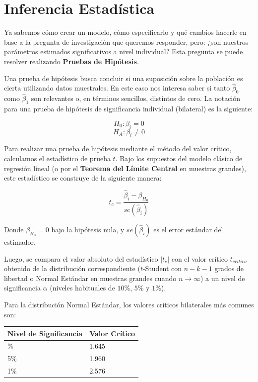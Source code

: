 \documentclass[
]{book}
\newcounter{none} %
\begin{document}
\section{Inferencia Estadística}\label{inferencia-estaduxedstica}

Ya sabemos cómo crear un modelo, cómo especificarlo y qué cambios hacerle en base a la pregunta de investigación que queremos responder, pero: ¿son nuestros parámetros estimados significativos a nivel individual? Esta pregunta se puede resolver realizando \textbf{Pruebas de Hipótesis}.

Una prueba de hipótesis busca concluir si una suposición sobre la población es cierta utilizando datos muestrales. En este caso nos interesa saber si tanto \(\hat{\beta}_0\) como \(\hat{\beta}_1\) son relevantes o, en términos sencillos, distintos de cero. La notación para una prueba de hipótesis de significancia individual (bilateral) es la siguiente:

\[H_0: \beta_i = 0\]
\[H_A: \beta_i \neq 0\]

Para realizar una prueba de hipótesis mediante el método del valor crítico, calculamos el estadístico de prueba \(t\). Bajo los supuestos del modelo clásico de regresión lineal (o por el \textbf{Teorema del Límite Central} en muestras grandes), este estadístico se construye de la siguiente manera:

\[t_c = \frac{\hat{\beta}_i - \beta_{H_0}}{se(\hat{\beta}_i)}\]

Donde \(\beta_{H_0} = 0\) bajo la hipótesis nula, y \(se(\hat{\beta}_i)\) es el error estándar del estimador.

Luego, se compara el valor absoluto del estadístico \(|t_c|\) con el valor crítico \(t_{critico}\) obtenido de la distribución correspondiente (\(t\)-Student con \(n-k-1\) grados de libertad o Normal Estándar en muestras grandes cuando \(n\rightarrow \infty\)) a un nivel de significancia \(\alpha\) (niveles habituales de \(10\%\), \(5\%\) y \(1\%\)).

Para la distribución Normal Estándar, los valores críticos bilaterales más comunes son:

{\def\LTcaptype{none} %
\begin{longtable}[]{@{}ll@{}}
\toprule\noalign{}
Nivel de Significancia & Valor Crítico \\
\midrule\noalign{}
\endhead
\bottomrule\noalign{}
\endlastfoot
10\% & 1.645 \\
5\% & 1.960 \\
1\% & 2.576 \\
\end{longtable}
}
\end{document}
